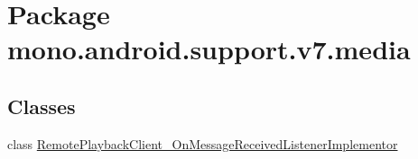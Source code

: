 \hypertarget{namespacemono_1_1android_1_1support_1_1v7_1_1media}{
\section{Package mono.android.support.v7.media}
\label{namespacemono_1_1android_1_1support_1_1v7_1_1media}
}
\subsection*{Classes}
\begin{CompactItemize}
\item 
class \hyperlink{classmono_1_1android_1_1support_1_1v7_1_1media_1_1_remote_playback_client___on_message_received_listener_implementor}{RemotePlaybackClient\_\-OnMessageReceivedListenerImplementor}
\end{CompactItemize}
